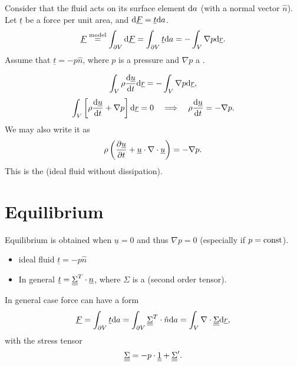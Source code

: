 \documentclass[11pt,oneside]{book}
\renewcommand{\vec}[1]{\underline{#1}}
\theoremstyle{definition} %
\theoremstyle{plain} %
\theoremstyle{remark} %
\theoremstyle{underline}
\begin{document}
  \begin{figure}[h]
    \centering
  \end{figure}

  Consider that the fluid acts on its surface element $\mathrm{d} a$ (with a normal vector $\hat n$).
  Let $\vec t$ be a force per unit area, and $\d \vec F = \vec t \d a$.
  \begin{displaymath}
    \vec F \os{\tm{model}}{=} \int_{\partial V} \d \vec F 
    = \int_{\partial V}  \vec t \d a
    = - \int_V \nabla p \d \vec r.
  \end{displaymath}
  Assume that $\vec t = - p \hat{n}$, where $p $ is a pressure and $\nabla p $ a .
  
  \begin{displaymath}
    \int_V \rho \dfrac{\vec u }{t} \d \vec r = - \int_V \nabla p \d \vec r,
  \end{displaymath}
  \begin{displaymath}
    \int_V \left[ \rho \dfrac{\vec u}{t} + \nabla p \right]\d \vec r = 0 
    \qLRa \rho \dfrac{ \vec u }{t} = - \nabla p.
  \end{displaymath}
  We may also write it as 
  \begin{displaymath}
    \rho \left( \ptf{\vec u}{t} + \vec u \cdot \nabla \cdot \vec u  \right) = - \nabla p.
  \end{displaymath}
  This is the  (ideal fluid without dissipation).
  
  \section{Equilibrium}
  Equilibrium is obtained when $\vec u = 0$ and thus $\nabla p = 0$
  (especially if $p = \textrm{const}$).
  \begin{itemize}
    \item ideal fluid $ \vec t = - p \hat n$
    \item In general $ \vec t = \ten{\Sigma}^T \cdot \vec n$, where $\Sigma$ is a  (second order tensor).
  \end{itemize}
  In general case force can have a form 
  \begin{displaymath}
    \vec F = \int_{\partial V} \vec t \d a = \int_{\partial V} \ten{\Sigma}^T \cdot \hat n \d a 
    = \int_V \nabla \cdot \ten{\Sigma} \d \vec r,
  \end{displaymath}
  with the stress tensor
  \begin{displaymath}
    \ten{\Sigma} = - p \cdot\ten{1} + \ten{\Sigma}'. %
  \end{displaymath}
\end{document}
